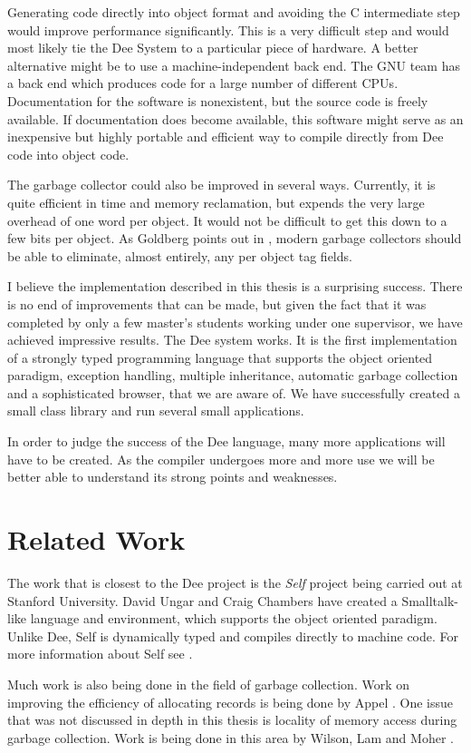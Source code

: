 Generating code directly into object format and avoiding the C
intermediate step would improve performance significantly.  This is a
very difficult step and would most likely tie the Dee System to a
particular piece of hardware.  A better alternative might be to use a
machine-independent back end.  The GNU team has a back end which
produces code for a large number of different CPUs.  Documentation for
the software is nonexistent, but the source code is freely available.
If documentation does become available, this software might serve as
an inexpensive but highly portable and efficient way to compile
directly from Dee code into object code.

The garbage collector could also be improved in several ways.
Currently, it is quite efficient in time and memory reclamation, but
expends the very large overhead of one word per object.  It would not
be difficult to get this down to a few bits per object.  As Goldberg
points out in \cite{Goldberg91}, modern garbage collectors should be
able to eliminate, almost entirely, any per object tag fields.

I believe the implementation described in this thesis is a surprising
success.  There is no end of improvements that can be made, but given
the fact that it was completed by only a few master's students working
under one supervisor, we have achieved impressive results.  The Dee
system works.  It is the first implementation of a strongly typed
programming language that supports the object oriented paradigm,
exception handling, multiple inheritance, automatic garbage collection
and a sophisticated browser, that we are aware of.  We have
successfully created a small class library and run several small
applications.

In order to judge the success of the Dee language, many more
applications will have to be created.  As the compiler undergoes more
and more use we will be better able to understand its strong points
and weaknesses.



\section{Related Work}

The work that is closest to the Dee project is the {\em Self} project
being carried out at Stanford University.  David Ungar and Craig
Chambers have created a Smalltalk-like language and environment, which
supports the object oriented paradigm.  Unlike Dee, Self is dynamically
typed and compiles directly to machine code.  For more information
about Self see \cite{Chambers91}.

Much work is also being done in the field of garbage collection.  Work
on improving the efficiency of allocating records is being done by
Appel \cite{Appel89}.  One issue that was not discussed in depth in
this thesis is locality of memory access during garbage collection.
Work is being done in this area by Wilson, Lam and Moher
\cite{Wilson91}.  


 
